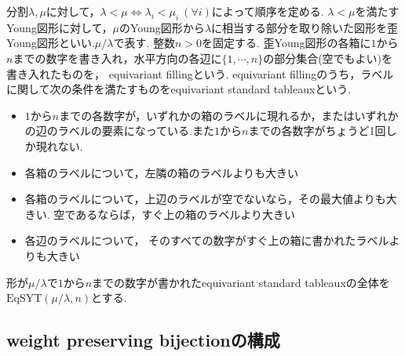\begin{defin}
  分割$\lambda, \mu$に対して，$\lambda<\mu\Leftrightarrow \lambda_i<\mu_i\:(\forall i)$によって順序を定める. $\lambda<\mu$を満たすYoung図形に対して，$\mu$のYoung図形から$\lambda$に相当する部分を取り除いた図形を歪Young図形といい.$\mu/\lambda$で表す. 整数$n>0$を固定する. 歪Young図形の各箱に$1$から$n$までの数字を書き入れ，水平方向の各辺に$\{1,\cdots,n\}$の部分集合(空でもよい)を書き入れたものを， equivariant fillingという. equivariant fillingのうち，ラベルに関して次の条件を満たすものをequivariant standard tableauxという.
  \begin{itemize}
    \item $1$から$n$までの各数字が，いずれかの箱のラベルに現れるか，またはいずれかの辺のラベルの要素になっている.また$1$から$n$までの各数字がちょうど1回しか現れない.
    \item 各箱のラベルについて，左隣の箱のラベルよりも大きい
    \item 各箱のラベルについて，上辺のラベルが空でないなら，その最大値よりも大きい. 空であるならば，すぐ上の箱のラベルより大きい
    \item 各辺のラベルについて， そのすべての数字がすぐ上の箱に書かれたラベルよりも大きい
  \end{itemize}
  形が$\mu/\lambda$で$1$から$n$までの数字が書かれたequivariant standard tableauxの全体を$\text{EqSYT}(\mu/\lambda, n)$とする.
\end{defin}

\begin{defin}
  
\end{defin}






\subsection{weight preserving bijectionの構成}